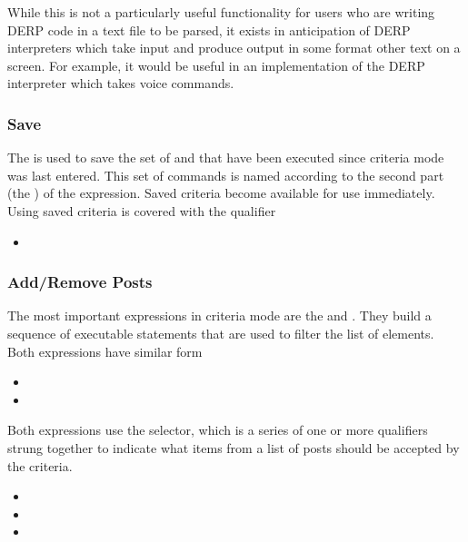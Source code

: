 While this is not a particularly useful functionality for users who are writing DERP code in a text file to be
parsed, it exists in anticipation of DERP interpreters which take input and produce output in some format other
text on a screen. For example, it would be useful in an implementation of the DERP interpreter which takes voice
commands.


\subsubsection{Save}
The  is used to save the set of  and  that have been executed since
criteria mode was last entered. This set of commands is named according to the second part (the ) of the
expression. Saved criteria become available for use immediately. Using saved criteria is covered with the  qualifier
\begin{itemize}[leftmargin=2in]
    \item[\nonterminal{save\_expression}] \bnf{:}  
\end{itemize}

\subsubsection{Add/Remove Posts}
The most important expressions in criteria mode are the  and . They build a sequence of
executable statements that are used to filter the list of elements. Both expressions have similar form
\begin{itemize}[leftmargin=2in]
    \item[\nonterminal{add\_expression}] \bnf{:}  
    \item[\nonterminal{remove\_expression}] \bnf{:}   
\end{itemize}

Both expressions use the selector, which is a series of one or more qualifiers strung together to indicate what
items from a list of posts should be accepted by the criteria.
\begin{itemize}[leftmargin=2in]
    \item[\nonterminal{selector}] \bnf{:} 
    \item[\nonterminal{qualifier\_or}] \bnf{:}    \bnf{|} 
    \item[\nonterminal{qualifier\_and}] \bnf{:}    \bnf{|}   
\end{itemize}

